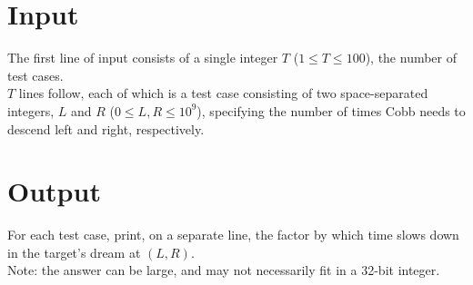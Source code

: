 \section*{Input}
The first line of input consists of a single integer $T$ ($1 \leq T \leq 100$), the number of test cases.\\
$T$ lines follow, each of which is a test case consisting of two space-separated integers, $L$ and $R$ ($0 \leq L, R \leq 10^{9}$), specifying the number of times Cobb needs to descend left and right, respectively.

\section*{Output}
For each test case, print, on a separate line, the factor by which time slows down in the target's dream at $(L, R)$.\\
Note: the answer can be large, and may not necessarily fit in a 32-bit integer.\\
